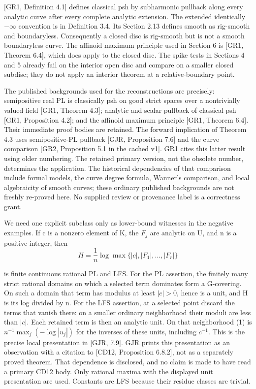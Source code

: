 \documentclass[11pt,a4paper]{article}
\begin{document}
[GR1, Definition 4.1] defines classical psh by subharmonic pullback along every analytic curve after every complete analytic extension. The extended identically \(-\infty\) convention is in Definition 3.4. Its Section 2.13 defines smooth as rig-smooth and boundaryless. Consequently a closed disc is rig-smooth but is not a smooth boundaryless curve. The affinoid maximum principle used in Section 6 is [GR1, Theorem 6.4], which does apply to the closed disc. The spike tests in Sections 4 and 5 already fail on the interior open disc and compare on a smaller closed subdisc; they do not apply an interior theorem at a relative-boundary point.

The published backgrounds used for the reconstructions are precisely: semipositive real PL is classically psh on good strict spaces over a nontrivially valued field [GR1, Theorem 4.3]; analytic and scalar pullback of classical psh [GR1, Proposition 4.2]; and the affinoid maximum principle [GR1, Theorem 6.4]. Their immediate proof bodies are retained. The forward implication of Theorem 4.3 uses semipositive-PL pullback [GJR, Proposition 7.6] and the curve comparison [GR2, Proposition 5.1 in the cached v1]. GR1 cites this latter result using older numbering. The retained primary version, not the obsolete number, determines the application. The historical dependencies of that comparison include formal models, the curve degree formula, Wanner's comparison, and local algebraicity of smooth curves; these ordinary published backgrounds are not freshly re-proved here. No supplied review or provenance label is a correctness grant.

We need one explicit subclass only as lower-bound witnesses in the negative examples. If c is a nonzero element of K, the \(F_j\) are analytic on U, and n is a positive integer, then
\[
H=\frac1n\log\max\{|c|,|F_1|,\ldots,|F_r|\}
\tag{1}
\]

is finite continuous rational PL and LFS. For the PL assertion, the finitely many strict rational domains on which a selected term dominates form a G-covering. On such a domain that term has modulus at least \(|c|>0\), hence is a unit, and H is its log divided by n. For the LFS assertion, at a selected point discard the terms that vanish there: on a smaller ordinary neighborhood their moduli are less than \(|c|\). Each retained term is then an analytic unit. On that neighborhood (1) is \(n^{-1}\max_j(-\log|u_j|)\) for the inverses of these units, including \(c^{-1}\). This is the precise local presentation in [GJR, 7.9]. GJR prints this presentation as an observation with a citation to [CD12, Proposition 6.8.2], not as a separately proved theorem. That dependence is disclosed, and no claim is made to have read a primary CD12 body. Only rational maxima with the displayed unit presentation are used. Constants are LFS because their residue classes are trivial.
\end{document}
